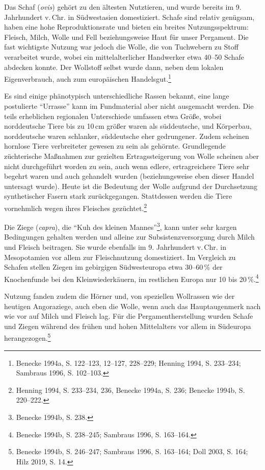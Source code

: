 \documentclass[a4paper,
fontsize=11pt,
oneside,
numbers=noperiodatend,
parskip=half-,
bibliography=totoc,
final
]{scrartcl}
\begin{document}
Das Schaf (\emph{ovis}) gehört zu den ältesten Nutztieren, und wurde
bereits im 9. Jahrhundert v.\,Chr. in Südwestasien domestiziert. Schafe
sind relativ genügsam, haben eine hohe Reproduktionsrate und bieten ein
breites Nutzungsspektrum: Fleisch, Milch, Wolle und Fell beziehungsweise
Haut für unser Pergament. Die fast wichtigste Nutzung war jedoch die
Wolle, die von Tuchwebern zu Stoff verarbeitet wurde, wobei ein
mittelalterlicher Handwerker etwa 40--50 Schafe abdecken konnte. Der
Wollstoff selbst wurde dann, neben dem lokalen Eigenverbrauch, auch zum
europäischen Handelsgut.\footnote{Benecke 1994a, S. 122--123, 12--127,
  228--229; Henning 1994, S. 233--234; Sambraus 1996, S. 102--103.}

Es sind einige phänotypisch unterschiedliche Rassen bekannt, eine lange
postulierte \enquote{Urrasse} kann im Fundmaterial aber nicht ausgemacht
werden. Die teils erheblichen regionalen Unterschiede umfassen etwa
Größe, wobei norddeutsche Tiere bis zu 10\,cm größer waren als
süddeutsche, und Körperbau, norddeutsche waren schlanker, süddeutsche
eher gedrungener. Zudem scheinen hornlose Tiere verbreiteter gewesen zu
sein als gehörnte. Grundlegende züchterische Maßnahmen zur gezielten
Ertragssteigerung von Wolle scheinen aber nicht durchgeführt worden zu
sein, auch wenn edlere, ertragreichere Tiere sehr begehrt waren und auch
gehandelt wurden (beziehungsweise eben dieser Handel untersagt wurde).
Heute ist die Bedeutung der Wolle aufgrund der Durchsetzung
synthetischer Fasern stark zurückgegangen. Stattdessen werden die Tiere
vornehmlich wegen ihres Fleisches gezüchtet.\footnote{Henning 1994, S.
  233--234, 236, Benecke 1994a, S. 236; Benecke 1994b, S. 220--222.}

Die Ziege (\emph{capra}), die \enquote{Kuh des kleinen
Mannes}\footnote{Benecke 1994b, S. 238.}, kann unter sehr kargen
Bedingungen gehalten werden und alleine zur Subsistenzversorgung durch
Milch und Fleisch beitragen. Sie wurde ebenfalls im 9. Jahrhundert
v.\,Chr. in Mesopotamien vor allem zur Fleischnutzung domestiziert. Im
Vergleich zu Schafen stellen Ziegen im gebirgigen Südwesteuropa etwa
30--60\,\% der Knochenfunde bei den Kleinwiederkäuern, im restlichen
Europa nur 10 bis 20\,\%.\footnote{Benecke 1994b, S. 238--245; Sambraus
  1996, S. 163--164.}

Nutzung fanden zudem die Hörner und, von speziellen Wollrassen wie der
heutigen Angoraziege, auch eben die Wolle, wenn auch das Hauptaugenmerk
nach wie vor auf Milch und Fleisch lag. Für die Pergamentherstellung
wurden Schafe und Ziegen während des frühen und hohen Mittelalters vor
allem in Südeuropa herangezogen.\footnote{Benecke 1994b, S. 246--247;
  Sambraus 1996, S. 163--164; Doll 2003, S. 164; Hilz 2019, S. 14.}
\end{document}
